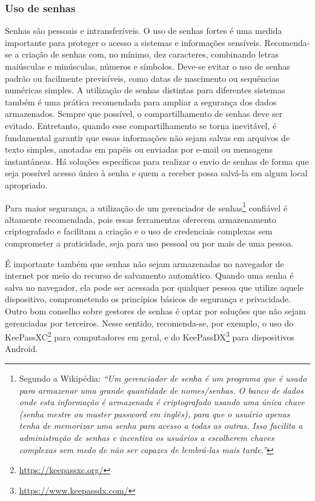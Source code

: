 \subsubsection{Uso de senhas}

Senhas são pessoais e intransferíveis. O uso de senhas fortes é uma medida importante para proteger o acesso a sistemas e informações sensíveis. Recomenda-se a criação de senhas com, no mínimo, dez caracteres, combinando letras maiúsculas e minúsculas, números e símbolos. Deve-se evitar o uso de senhas padrão ou facilmente previsíveis, como datas de nascimento ou sequências numéricas simples. A utilização de senhas distintas para diferentes sistemas também é uma prática recomendada para ampliar a segurança dos dados armazenados. Sempre que possível, o compartilhamento de senhas deve ser evitado. Entretanto, quando esse compartilhamento se torna inevitável, é fundamental garantir que essas informações não sejam salvas em arquivos de texto simples, anotadas em papéis ou enviadas por e-mail ou mensagens instantâneas. Há soluções específicas para realizar o envio de senhas de forma que seja possível acesso único à senha e quem a receber possa salvá-la em algum local apropriado.

Para maior segurança, a utilização de um gerenciador de senhas\footnote{Segundo a Wikipédia: \textit{``Um gerenciador de senha é um programa que é usado para armazenar uma grande quantidade de nomes/senhas. O banco de dados onde esta informação é armazenada é criptografado usando uma única chave (senha mestre ou \foreignlanguage{english}{master password} em inglês), para que o usuário apenas tenha de memorizar uma senha para acesso a todas as outras. Isso facilita a administração de senhas e incentiva os usuários a escolherem chaves complexas sem medo de não ser capazes de lembrá-las mais tarde.''}\cite{wikipediaGerenciadorSenha}} confiável é altamente recomendada, pois essas ferramentas oferecem armazenamento criptografado e facilitam a criação e o uso de credenciais complexas sem comprometer a praticidade, seja para uso pessoal ou por mais de uma pessoa.

É importante também que senhas não sejam armazenadas no navegador de internet por meio do recurso de salvamento automático. Quando uma senha é salva no navegador, ela pode ser acessada por qualquer pessoa que utilize aquele dispositivo, comprometendo os princípios básicos de segurança e privacidade. Outro bom conselho sobre gestores de senhas é optar por soluções que não sejam gerenciadas por terceiros. Nesse sentido, recomenda-se, por exemplo, o uso do KeePassXC\footnote{\url{https://keepassxc.org/}} para computadores em geral, e do KeePassDX\footnote{\url{https://www.keepassdx.com/}} para dispositivos Android.


